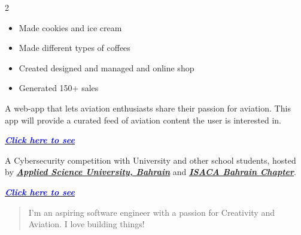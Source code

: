 \documentclass[10pt,a4paper,withhyper]{altacv}
\begin{document}
\begin{paracol}{2}

\begin{itemize}
\item Made cookies and ice cream
\item Made different types of coffees
\end{itemize}

\divider

\begin{itemize}
\item Created designed and managed and online shop
\item Generated 150+ sales
\end{itemize}


\begin{itemize}
A web-app that lets aviation enthusiasts share their passion for aviation. This app will provide a curated feed of aviation content the user is interested in.
\end{itemize}
\href{https://docs.google.com/document/d/1pWOtEOxm7aP5mE0FJZz1KgR_11sMZT2RKtRK7JkRwXE/edit?usp=sharing}{\textbf{\textit{\textcolor{blue}{Click here to see}}}}
\divider

\begin{itemize}A Cybersecurity competition with University and other school students, hosted by \href{https://www.asu.edu.bh/}{\textbf{\textit{Applied Science University, Bahrain}}} and \href{https://engage.isaca.org/bahrainchapter/home}{\textit{\textbf{ISACA Bahrain Chapter}}}.
\end{itemize}

\href{https://www.instagram.com/p/DIjhPNSsdv_/?utm_source=ig_web_copy_link&igsh=MzRlODBiNWFlZA==}{\textbf{\textit{\textcolor{blue}{Click here to see}}}}
\medskip





\switchcolumn


\begin{quote}
I'm an aspiring software engineer with a passion for Creativity and Aviation. I love building things!
\end{quote}


\end{paracol}
\end{document}
